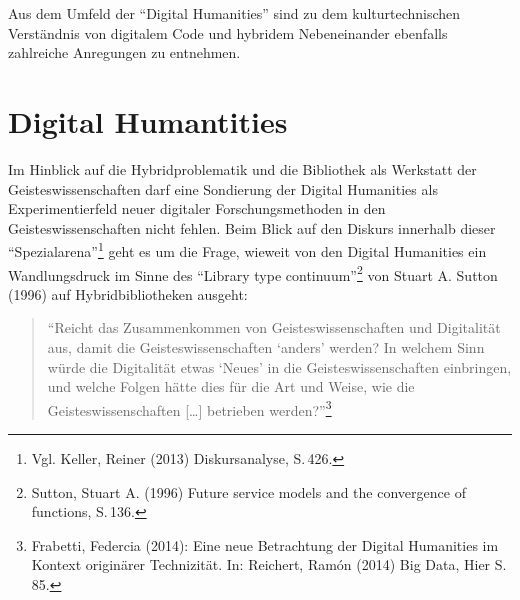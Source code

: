\documentclass[a4paper,
fontsize=11pt,
oneside,
numbers=noperiodatend,
parskip=half-,
bibliography=totoc,
final
]{scrartcl}
\begin{document}
Aus dem Umfeld der \enquote{Digital Humanities} sind zu dem
kulturtechnischen Verständnis von digitalem Code und hybridem
Nebeneinander ebenfalls zahlreiche Anregungen zu entnehmen.

\section*{Digital Humantities}\label{digital-humantities}

Im Hinblick auf die Hybridproblematik und die Bibliothek als Werkstatt
der Geisteswissenschaften darf eine Sondierung der Digital Humanities
als Experimentierfeld neuer digitaler Forschungsmethoden in den
Geisteswissenschaften nicht fehlen. Beim Blick auf den Diskurs innerhalb
dieser \enquote{Spezialarena}\footnote{Vgl. Keller, Reiner (2013)
  Diskursanalyse, S.\,426.} geht es um die Frage, wieweit von den Digital
Humanities ein Wandlungsdruck im Sinne des \enquote{Library type
continuum}\footnote{Sutton, Stuart A. (1996) Future service models and
  the convergence of functions, S.\,136.} von Stuart A. Sutton (1996) auf
Hybridbibliotheken ausgeht:

\begin{quote}
\enquote{Reicht das Zusammenkommen von Geisteswissenschaften und
Digitalität aus, damit die Geisteswissenschaften \enquote{anders}
werden? In welchem Sinn würde die Digitalität etwas \enquote{Neues} in
die Geisteswissenschaften einbringen, und welche Folgen hätte dies für
die Art und Weise, wie die Geisteswissenschaften {[}\ldots{}{]}
betrieben werden?}\footnote{Frabetti, Federcia (2014): Eine neue
  Betrachtung der Digital Humanities im Kontext originärer Technizität.
  In: Reichert, Ramón (2014) Big Data, Hier S.\,85.}
\end{quote}
\end{document}
